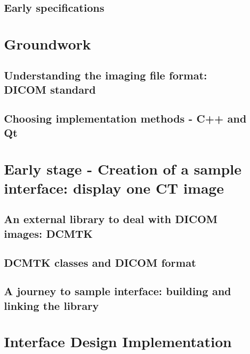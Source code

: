 \documentclass[12pt,twoside]{article}
\begin{document}
\clearpage
\subsection{Early specifications}



\clearpage
\section{Groundwork}
\subsection{Understanding the imaging file format: DICOM standard}



\clearpage
\subsection{Choosing implementation methods - C++ and Qt}



\clearpage
\section{Early stage - Creation of a sample interface: display one CT image}
\subsection{An external library to deal with DICOM images: DCMTK}


\clearpage
\subsection{DCMTK classes and DICOM format}


\clearpage
\subsection{A journey to sample interface: building and linking the library}




\clearpage
\section{Interface Design Implementation}
\end{document}
